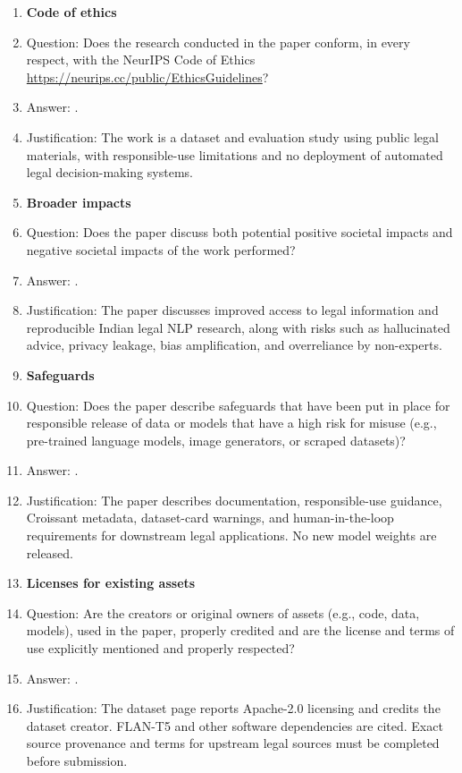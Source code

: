 \begin{enumerate}
\item {\bf Code of ethics}
    \item[] Question: Does the research conducted in the paper conform, in every respect, with the NeurIPS Code of Ethics \url{https://neurips.cc/public/EthicsGuidelines}?
    \item[] Answer: \answerYes{}.
    \item[] Justification: The work is a dataset and evaluation study using public legal materials, with responsible-use limitations and no deployment of automated legal decision-making systems.

\item {\bf Broader impacts}
    \item[] Question: Does the paper discuss both potential positive societal impacts and negative societal impacts of the work performed?
    \item[] Answer: \answerYes{}.
    \item[] Justification: The paper discusses improved access to legal information and reproducible Indian legal NLP research, along with risks such as hallucinated advice, privacy leakage, bias amplification, and overreliance by non-experts.

\item {\bf Safeguards}
    \item[] Question: Does the paper describe safeguards that have been put in place for responsible release of data or models that have a high risk for misuse (e.g., pre-trained language models, image generators, or scraped datasets)?
    \item[] Answer: \answerYes{}.
    \item[] Justification: The paper describes documentation, responsible-use guidance, Croissant metadata, dataset-card warnings, and human-in-the-loop requirements for downstream legal applications. No new model weights are released.

\item {\bf Licenses for existing assets}
    \item[] Question: Are the creators or original owners of assets (e.g., code, data, models), used in the paper, properly credited and are the license and terms of use explicitly mentioned and properly respected?
    \item[] Answer: \answerYes{}.
    \item[] Justification: The dataset page reports Apache-2.0 licensing and credits the dataset creator. FLAN-T5 and other software dependencies are cited. Exact source provenance and terms for upstream legal sources must be completed before submission.


\end{enumerate}
